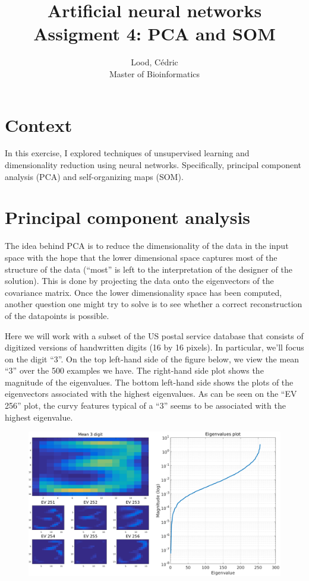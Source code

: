 \documentclass[11pt, a4paper]{article}
\title{ \huge Artificial neural networks \\ 
  { \large Assigment 4: PCA and SOM }}
\author{
        Lood, Cédric \\
        \small Master of Bioinformatics
}
\begin{document}
\maketitle

\section{Context}

In this exercise, I explored techniques of unsupervised learning and
dimensionality reduction using neural networks. Specifically, principal
component analysis (PCA) and self-organizing maps (SOM).

\section{Principal component analysis}

The idea behind PCA is to reduce the dimensionality of the data in the
input space with the hope that the lower dimensional space captures
most of the structure of the data (``most'' is left to the interpretation
of the designer of the solution). This is done by projecting the data
onto the eigenvectors of the covariance matrix. Once the lower
dimensionality space has been computed, another question one might try
to solve is to see whether a correct reconstruction of the datapoints
is possible.

Here we will work with a subset of the US postal service database that
consists of digitized versions of handwritten digits (16 by 16
pixels). In particular, we'll focus on the digit ``3''. On the top
left-hand side of the figure below, we view the mean ``3'' over the
500 examples we have. The right-hand side plot shows the magnitude of
the eigenvalues. The bottom left-hand side shows the plots of the
eigenvectors associated with the highest eigenvalues. As can be seen
on the ``EV 256'' plot, the curvy features typical of a ``3'' seems to
be associated with the highest eigenvalue.

\begin{figure}[H]
    \centering
    \includegraphics[scale=.25]{mean_threess.png}
    \label{fig:mean_three}
\end{figure}
\end{document}
